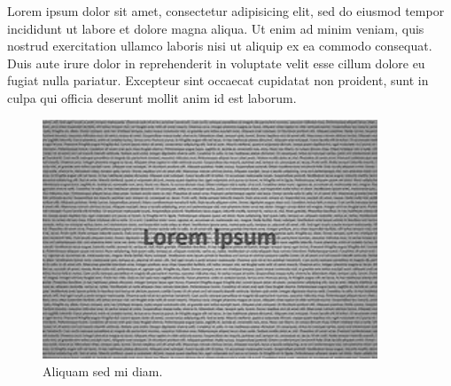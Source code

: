\documentclass[a4paper]{article}
\begin{document}
Lorem ipsum dolor sit amet, consectetur adipisicing elit, sed do eiusmod tempor incididunt ut labore et dolore magna aliqua. Ut enim ad minim veniam, quis nostrud exercitation ullamco laboris nisi ut aliquip ex ea commodo consequat. Duis aute irure dolor in reprehenderit in voluptate velit esse cillum dolore eu fugiat nulla pariatur. Excepteur sint occaecat cupidatat non proident, sunt in culpa qui officia deserunt mollit anim id est laborum.

\begin{figure}
\includegraphics[width=10cm]{lorem-ipsum-text.jpg}
\caption{Aliquam sed mi diam.}
\label{figure:Lorem Ipsum}
\end{figure}
\end{document}
